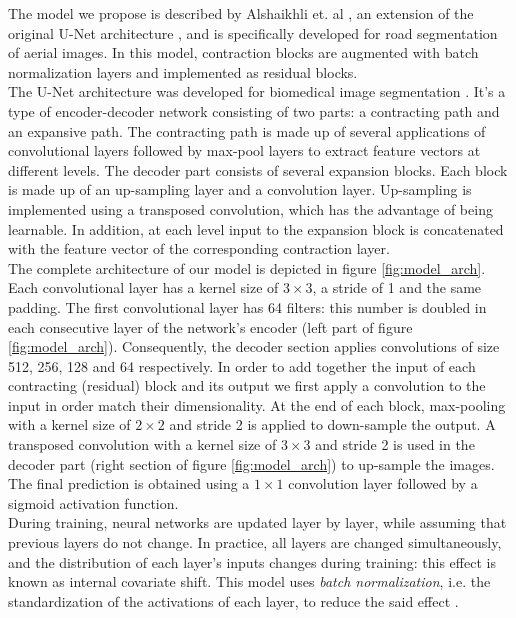 \documentclass[10pt,conference,compsocconf]{IEEEtran}
\begin{document}
The model we propose is described by Alshaikhli et. al \cite{unet_roadseg}, an extension of the original U-Net architecture \cite{unet_medical}, and is specifically developed for road segmentation of aerial images. In this model, contraction blocks are augmented with batch normalization layers and implemented as residual blocks.  \\ 

The U-Net architecture was developed for biomedical image segmentation \cite{unet_medical}. It's a type of encoder-decoder network consisting of two parts: a contracting path and an expansive path. The contracting path is made up of several applications of convolutional layers followed by max-pool layers to extract feature vectors at different levels. The decoder part consists of several expansion blocks. Each block is made up of an up-sampling layer and a convolution layer. Up-sampling is implemented using a transposed convolution, which has the advantage of being learnable. In addition, at each level input to the expansion block is concatenated with the feature vector of the corresponding contraction layer. \\

The complete architecture of our model is depicted in figure \ref{fig:model_arch}. Each convolutional layer has a kernel size of $3 \times 3$, a  stride of 1 and the same padding. The first convolutional layer has 64 filters: this number is doubled in each consecutive layer of the network's encoder (left part of figure \ref{fig:model_arch}). Consequently, the decoder section applies convolutions of size 512, 256, 128 and 64 respectively. In order to add together the input of each contracting (residual) block and its output we first apply a convolution to the input in order match their dimensionality. At the end of each block, max-pooling with a kernel size of $2 \times 2$ and stride 2 is applied to down-sample the output. A transposed convolution with a kernel size of $3 \times 3$ and stride 2 is used in the decoder part (right section of figure \ref{fig:model_arch}) to up-sample the images. The final prediction is obtained using a $1 \times 1$ convolution layer followed by a sigmoid activation function. \\

During training, neural networks are updated layer by layer, while assuming that previous layers do not change. In practice, all layers are changed simultaneously, and the distribution of each layer’s inputs changes during training: this effect is known as internal covariate shift. This model uses \textit{batch normalization}, i.e. the standardization of the activations of each layer, to reduce the said effect \cite{batchnorm}. \\
\end{document}
